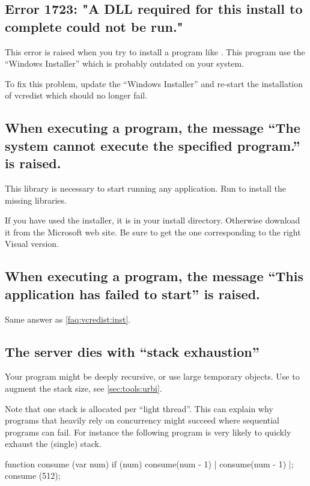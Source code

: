 \subsection{Error 1723: "A DLL required for this install to complete could
  not be run."}

This error is raised when you try to install a program like
.  This program use the ``Windows Installer''
which is probably outdated on your system.

To fix this problem, update the ``Windows Installer'' and re-start the
installation of vcredist which should no longer fail.

\subsection{When executing a program, the message ``The system cannot
  execute the specified program.'' is raised.}
\label{faq:vcredist:inst}

This library is necessary to start running any application.  Run
 to install the missing libraries.

If you have used the \usdk installer, it is  in
your install directory.  Otherwise download it from the Microsoft web site.
Be sure to get the one corresponding to the right Visual \Cxx version.

\subsection{When executing a program, the message ``This application has
  failed to start'' is raised.}

Same answer as \autoref{faq:vcredist:inst}.

\subsection{The server dies with ``stack exhaustion''}
Your program might be deeply recursive, or use large temporary
objects.  Use  to augment the stack size, see
\autoref{sec:tools:urbi}.

Note that one stack is allocated per ``light thread''.  This can
explain why programs that heavily rely on concurrency might succeed
where sequential programs can fail.  For instance the following
program is very likely to quickly exhaust the (single) stack.

\begin{urbiunchecked}
function consume (var num)
{
  if (num)
    consume(num - 1) | consume(num - 1)
}|;
consume (512);
\end{urbiunchecked}

